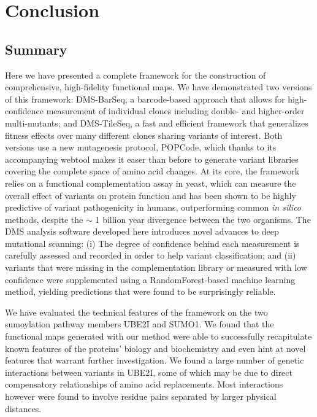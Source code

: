 
\chapter{Conclusion}

\section{Summary}

Here we have presented a complete framework for the construction of comprehensive, high-fidelity functional maps. We have demonstrated two versions of this framework: DMS-BarSeq, a barcode-based approach that allows for high-confidence measurement of individual clones including double- and higher-order multi-mutants; and DMS-TileSeq, a fast and efficient framework that generalizes fitness effects over many different clones sharing variants of interest. Both versions use a new mutagenesis protocol, POPCode, which thanks to its accompanying webtool makes it easer than before to generate variant libraries covering the complete space of amino acid changes. At its core, the framework relies on a functional complementation assay in yeast, which can measure the overall effect of variants on protein function and has been shown to be highly predictive of variant pathogenicity in humans, outperforming common \textit{in silico} methods, despite the $\sim$ 1 billion year divergence between the two organisms. 
The DMS analysis software developed here introduces novel advances to deep mutational scanning: (i) The degree of confidence behind each measurement is carefully assessed and recorded in order to help variant classification; and (ii) variants that were missing in the complementation library or measured with low confidence were supplemented using a RandomForest-based machine learning method, yielding predictions that were found to be surprisingly reliable. 

We have evaluated the technical features of the framework on the two sumoylation pathway members UBE2I and SUMO1. We found that the functional maps generated with our method were able to successfully recapitulate known features of the proteins' biology and biochemistry and even hint at novel features that warrant further investigation. We found a large number of genetic interactions between variants in UBE2I, some of which may be due to direct compensatory relationships of amino acid replacements. Most interactions however were found to involve residue pairs separated by larger physical distances.

